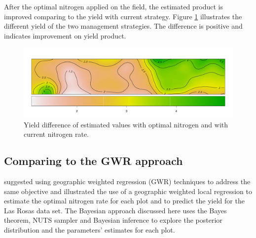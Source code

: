 \documentclass[a4paper]{article}   	%
\begin{document}
	

	After the optimal nitrogen applied on the field, the estimated product is improved comparing to the yield with current strategy. Figure \ref{fig:stdiff} illustrates the different yield of the two management strategies. The difference is positive and indicates improvement on yield product. 	
	
	\begin{figure}[!htp]
		\centering	
		\includegraphics[width=\textwidth]{Images/ST_DiffYield}
		\caption{Yield difference of estimated values with optimal nitrogen and with current nitrogen rate.}\label{fig:stdiff}
	\end{figure}
	
	
	\subsection{Comparing to the GWR approach}\label{sec:comparegwr}
	
	\textcite{Rakshit2020Novel} suggested using geographic weighted regression (GWR) techniques to address the same objective and illustrated the use of a geographic weighted local regression to estimate the optimal nitrogen rate for each plot and to predict the yield for the Las Rosas data set. The Bayesian approach discussed here uses the Bayes theorem, NUTS sampler and Bayesian inference to explore the posterior distribution and the parameters' estimates for each plot. 
	
\end{document}
